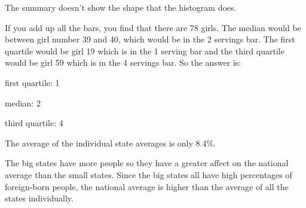 \documentclass{exam}
\begin{document}
\begin{description}
        The summary doesn't show the shape that the histogram does.

      \item[30]
        If you add up all the bars, you find that there are 78 girls.  The
        median would be between girl number 39 and 40, which would be in the 2
        servings bar.  The first quartile would be girl 19 which is in the 1
        serving bar and the third quartile would be girl 59 which is in the 4
        servings bar.  So the answer is:

        \begin{itemize*}
          \item first quartile: 1
          \item median: 2
          \item third quartile: 4
        \end{itemize*}
        
      \pagebreak

      \item[32]

      \item[37]
        The average of the individual state averages is only 8.4\%.

        The big states have more people so they have a greater affect on the
        national average than the small states.  Since the big states all have
        high percentages of foreign-born people, the national average is higher
        than the average of all the states individually.


\end{description}
\end{document}
